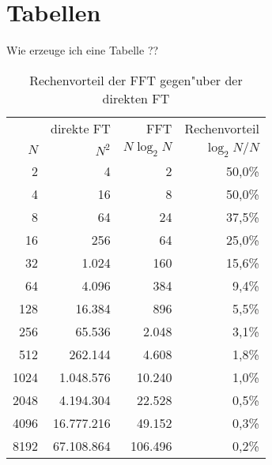 \chapter{Tabellen}
\label{Tabellen}
\thispagestyle{empty}

Wie erzeuge ich eine Tabelle ??

\vspace{5cm}

\begin{table}[h]
 \caption{Rechenvorteil der FFT gegen"uber der direkten FT}
 \begin{center}
 \begin{tabular}{|rrrr|}
 \hline
 & direkte FT & FFT & Rechenvorteil\\
 $N$ & $N^{2}$ & $N \log_{2} N$ & $\log_{2} N/N$ \\
 \hline
 \hline
   2&          4&        2&     50,0\%\\
   4&         16&        8&     50,0\%\\
   8&         64&       24&     37,5\%\\
  16&        256&       64&     25,0\%\\
  32&      1.024&      160&     15,6\%\\
  64&      4.096&      384&      9,4\%\\
 128&     16.384&      896&      5,5\%\\
 256&     65.536&    2.048&      3,1\%\\
 512&    262.144&    4.608&      1,8\%\\
1024&  1.048.576&   10.240&      1,0\%\\
2048&  4.194.304&   22.528&      0,5\%\\
4096& 16.777.216&   49.152&      0,3\%\\
8192& 67.108.864&  106.496&      0,2\%\\
 \hline
  \end{tabular}
 \end{center}
 \label{tablerechenvorteilfft}
\end{table}   

\newpage

